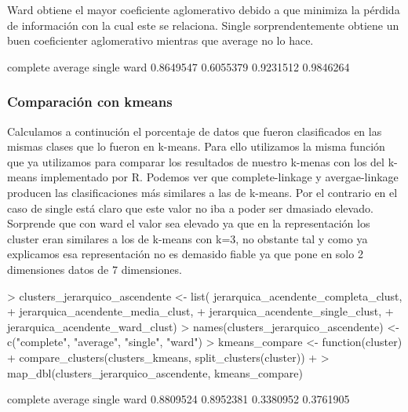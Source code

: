 \documentclass [a4paper] {article}
\begin{document}
Ward obtiene el mayor coeficiente aglomerativo debido a que minimiza la pérdida de información con la cual este se relaciona.
Single sorprendentemente obtiene un buen coeficienter aglomerativo mientras que average no lo hace.
\begin{Schunk}
\begin{Soutput}
 complete   average    single      ward 
0.8649547 0.6055379 0.9231512 0.9846264 
\end{Soutput}
\end{Schunk}

\subsubsection{Comparación con kmeans}
Calculamos a continución el porcentaje de datos que fueron clasificados en las mismas clases que lo fueron en k-means.
Para ello utilizamos la misma función que ya utilizamos para comparar los resultados de nuestro k-menas con los del k-means implementado por R.
Podemos ver que complete-linkage y avergae-linkage producen las clasificaciones más similares a las de k-means.
Por el contrario en el caso de single está claro que este valor no iba a poder ser dmasiado elevado.
Sorprende que con ward el valor sea elevado ya que en la representación los cluster eran similares a los de k-means con k=3,
no obstante tal y como ya explicamos esa representación no es demasido fiable ya que pone en solo 2 dimensiones datos de 7 dimensiones.
\begin{Schunk}
\begin{Sinput}
> clusters_jerarquico_ascendente <- list( jerarquica_acendente_completa_clust,
+                                      jerarquica_acendente_media_clust, 
+                                      jerarquica_acendente_single_clust, 
+                                      jerarquica_acendente_ward_clust)
> names(clusters_jerarquico_ascendente) <- c("complete", "average", "single", "ward")
> kmeans_compare <- function(cluster) {
+   compare_clusters(clusters_kmeans, split_clusters(cluster))
+ }
> map_dbl(clusters_jerarquico_ascendente, kmeans_compare)
\end{Sinput}
\begin{Soutput}
 complete   average    single      ward 
0.8809524 0.8952381 0.3380952 0.3761905 
\end{Soutput}
\end{Schunk}
\end{document}
